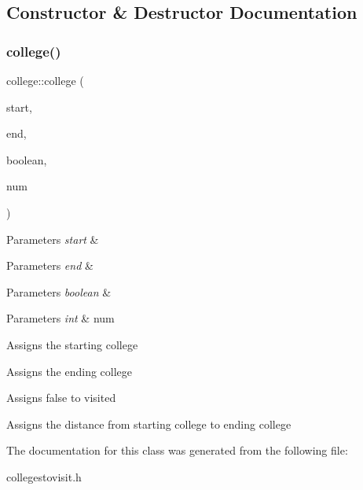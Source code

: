 \subsection{Constructor \& Destructor Documentation}
\mbox{\label{classcollege_afdcf43c3638a4312b0174c53dcb5e4aa}} 
\subsubsection{\texorpdfstring{college()}{college()}}
{\footnotesize\ttfamily college\+::college (\begin{DoxyParamCaption}\item[{Q\+String}]{start,  }\item[{Q\+String}]{end,  }\item[{bool}]{boolean,  }\item[{int}]{num }\end{DoxyParamCaption})\hspace{0.3cm}{\ttfamily [inline]}}


\begin{DoxyItemize}
\item 
\begin{DoxyParams}{Parameters}
{\em start} & \\
\hline
\end{DoxyParams}

\item 
\begin{DoxyParams}{Parameters}
{\em end} & \\
\hline
\end{DoxyParams}

\item 
\begin{DoxyParams}{Parameters}
{\em boolean} & \\
\hline
\end{DoxyParams}

\item 
\begin{DoxyParams}{Parameters}
{\em int} & num \\
\hline
\end{DoxyParams}

\end{DoxyItemize}Assigns the starting college

Assigns the ending college

Assigns false to visited

Assigns the distance from starting college to ending college 

The documentation for this class was generated from the following file\+:\begin{DoxyCompactItemize}
\item 
collegestovisit.\+h\end{DoxyCompactItemize}
